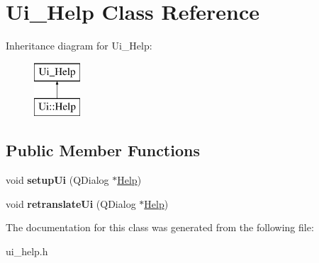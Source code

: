 \hypertarget{class_ui___help}{}\section{Ui\+\_\+\+Help Class Reference}
\label{class_ui___help}
Inheritance diagram for Ui\+\_\+\+Help\+:\begin{figure}[H]
\begin{center}
\leavevmode
\includegraphics[height=2.000000cm]{class_ui___help}
\end{center}
\end{figure}
\subsection*{Public Member Functions}
\begin{DoxyCompactItemize}
\item 
\mbox{\label{class_ui___help_acd2c60ca2345d1ab4c5c9c770071a024}} 
void {\bfseries setup\+Ui} (Q\+Dialog $\ast$\hyperlink{class_help}{Help})
\item 
\mbox{\label{class_ui___help_a7d7ecfed16238fc52df88526d132281a}} 
void {\bfseries retranslate\+Ui} (Q\+Dialog $\ast$\hyperlink{class_help}{Help})
\end{DoxyCompactItemize}


The documentation for this class was generated from the following file\+:\begin{DoxyCompactItemize}
\item 
ui\+\_\+help.\+h\end{DoxyCompactItemize}
